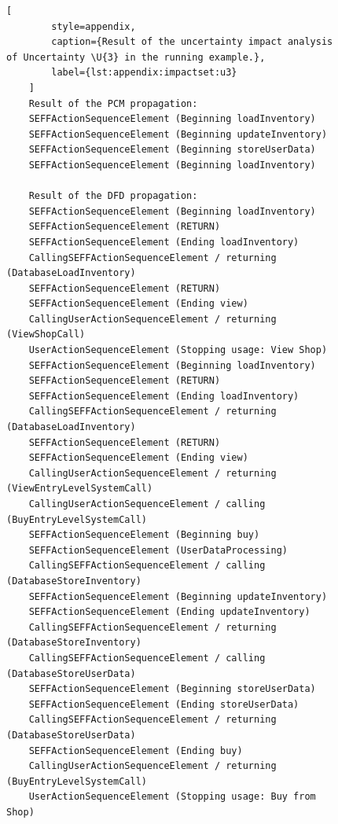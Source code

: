 \begin{figure}
    \begin{lstlisting}[
        style=appendix,
        caption={Result of the uncertainty impact analysis of Uncertainty \U{3} in the running example.},
        label={lst:appendix:impactset:u3}
    ]
    Result of the PCM propagation:
    SEFFActionSequenceElement (Beginning loadInventory)
    SEFFActionSequenceElement (Beginning updateInventory)
    SEFFActionSequenceElement (Beginning storeUserData)
    SEFFActionSequenceElement (Beginning loadInventory)
    
    Result of the DFD propagation:
    SEFFActionSequenceElement (Beginning loadInventory)
    SEFFActionSequenceElement (RETURN)
    SEFFActionSequenceElement (Ending loadInventory)
    CallingSEFFActionSequenceElement / returning (DatabaseLoadInventory)
    SEFFActionSequenceElement (RETURN)
    SEFFActionSequenceElement (Ending view)
    CallingUserActionSequenceElement / returning (ViewShopCall)
    UserActionSequenceElement (Stopping usage: View Shop)
    SEFFActionSequenceElement (Beginning loadInventory)
    SEFFActionSequenceElement (RETURN)
    SEFFActionSequenceElement (Ending loadInventory)
    CallingSEFFActionSequenceElement / returning (DatabaseLoadInventory)
    SEFFActionSequenceElement (RETURN)
    SEFFActionSequenceElement (Ending view)
    CallingUserActionSequenceElement / returning (ViewEntryLevelSystemCall)
    CallingUserActionSequenceElement / calling (BuyEntryLevelSystemCall)
    SEFFActionSequenceElement (Beginning buy)
    SEFFActionSequenceElement (UserDataProcessing)
    CallingSEFFActionSequenceElement / calling (DatabaseStoreInventory)
    SEFFActionSequenceElement (Beginning updateInventory)
    SEFFActionSequenceElement (Ending updateInventory)
    CallingSEFFActionSequenceElement / returning (DatabaseStoreInventory)
    CallingSEFFActionSequenceElement / calling (DatabaseStoreUserData)
    SEFFActionSequenceElement (Beginning storeUserData)
    SEFFActionSequenceElement (Ending storeUserData)
    CallingSEFFActionSequenceElement / returning (DatabaseStoreUserData)
    SEFFActionSequenceElement (Ending buy)
    CallingUserActionSequenceElement / returning (BuyEntryLevelSystemCall)
    UserActionSequenceElement (Stopping usage: Buy from Shop)
    \end{lstlisting}
\end{figure}

